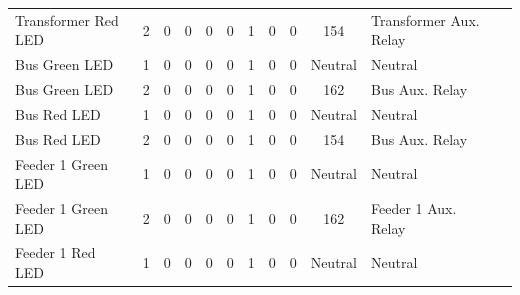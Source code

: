 \begin{table}[!htp]
{\begin{tabular}{lcccccccccll}
			Transformer Red LED        & 2                       & 0                                           & 0                                          & 0           & 0           & 1            & 0                & 0 & 154                          & Transformer Aux. Relay           &                \\
			Bus Green LED              & 1                       & 0                                           & 0                                          & 0           & 0           & 1            & 0                & 0 & Neutral                      & Neutral                          &                \\
			Bus Green LED              & 2                       & 0                                           & 0                                          & 0           & 0           & 1            & 0                & 0 & 162                          & Bus Aux. Relay                   &                \\
			Bus Red LED                & 1                       & 0                                           & 0                                          & 0           & 0           & 1            & 0                & 0 & Neutral                      & Neutral                          &                \\
			Bus Red LED                & 2                       & 0                                           & 0                                          & 0           & 0           & 1            & 0                & 0 & 154                          & Bus Aux. Relay                   &                \\
			Feeder 1 Green LED         & 1                       & 0                                           & 0                                          & 0           & 0           & 1            & 0                & 0 & Neutral                      & Neutral                          &                \\
			Feeder 1 Green LED         & 2                       & 0                                           & 0                                          & 0           & 0           & 1            & 0                & 0 & 162                          & Feeder 1 Aux. Relay              &                \\
			Feeder 1 Red LED           & 1                       & 0                                           & 0                                          & 0           & 0           & 1            & 0                & 0 & Neutral                      & Neutral                          &                \\

\end{tabular}}
\end{table}
